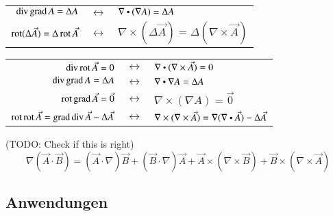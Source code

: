 \begin{center}
    \begin{tabular}[]{r c l}
        $ \operatorname{div} \operatorname{grad} A = \Delta A $ & $\leftrightarrow$ & $ \nabla \dotp (\nabla A) = \Delta A $ \\
        $ \operatorname{rot} (\Delta \vec{A}) = \Delta \operatorname{rot} \vec{A} $ & $\leftrightarrow$ & $ \nabla \times (\Delta \vec{A}) = \Delta (\nabla \times \vec{A}) $ \\
    \end{tabular}
\end{center}

\begin{center}
    \begin{tabular}[]{r c l}
        $ \operatorname{div} \operatorname{rot} \vec{A} = 0 $ & $\leftrightarrow$ & $ \nabla \dotp (\nabla \times \vec{A}) = 0 $ \\
        $ \operatorname{div} \operatorname{grad} A = \Delta A $ & $\leftrightarrow$ & $\nabla \dotp \nabla A = \Delta A $ \\
        $ \operatorname{rot} \operatorname{grad} \vec{A} = \vec{0} $ & $\leftrightarrow$ & $ \nabla \times (\nabla A) = \vec{0} $ \\
        $ \operatorname{rot} \operatorname{rot} \vec{A} = \operatorname{grad} \operatorname{div} \vec{A} - \Delta \vec{A} $ & $\leftrightarrow$ & $\nabla \times (\nabla \times \vec{A}) = \nabla (\nabla \dotp \vec{A}) - \Delta \vec{A} $ \\
    \end{tabular}
\end{center}


 (TODO: Check if this is right)
\[ \nabla(\vec{A} \cdot \vec{B}) = (\vec{A} \cdot \nabla) \vec{B} + (\vec{B} \cdot \nabla) \vec{A} + \vec{A} \times (\nabla \times \vec{B}) + \vec{B} \times (\nabla \times \vec{A}) \]


\subsection{Anwendungen}

